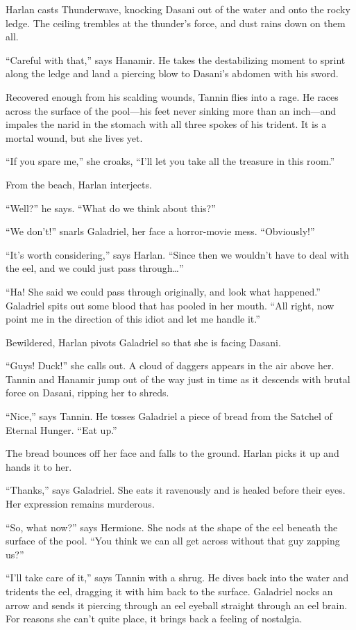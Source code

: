 \documentclass[smalldemyvopaper,11pt,twoside,onecolumn,openright,extrafontsizes]{memoir}
\begin{document}
Harlan casts Thunderwave, knocking Dasani out of the water and onto the
rocky ledge. The ceiling trembles at the thunder's force, and dust rains
down on them all.

``Careful with that,'' says Hanamir. He takes the destabilizing moment
to sprint along the ledge and land a piercing blow to Dasani's abdomen
with his sword.

Recovered enough from his scalding wounds, Tannin flies into a rage. He
races across the surface of the pool---his feet never sinking more than
an inch---and impales the narid in the stomach with all three spokes of
his trident. It is a mortal wound, but she lives yet.

``If you spare me,'' she croaks, ``I'll let you take all the treasure in
this room.''

From the beach, Harlan interjects.

``Well?'' he says. ``What do we think about this?''

``We don't!'' snarls Galadriel, her face a horror-movie mess.
``Obviously!''

``It's worth considering,'' says Harlan. ``Since then we wouldn't have
to deal with the eel, and we could just pass through\ldots{}''

``Ha! She said we could pass through originally, and look what
happened.'' Galadriel spits out some blood that has pooled in her mouth.
``All right, now point me in the direction of this idiot and let me
handle it.''

Bewildered, Harlan pivots Galadriel so that she is facing Dasani.

``Guys! Duck!'' she calls out. A cloud of daggers appears in the air
above her. Tannin and Hanamir jump out of the way just in time as it
descends with brutal force on Dasani, ripping her to shreds.

``Nice,'' says Tannin. He tosses Galadriel a piece of bread from the
Satchel of Eternal Hunger. ``Eat up.''

The bread bounces off her face and falls to the ground. Harlan picks it
up and hands it to her.

``Thanks,'' says Galadriel. She eats it ravenously and is healed before
their eyes. Her expression remains murderous.

``So, what now?'' says Hermione. She nods at the shape of the eel
beneath the surface of the pool. ``You think we can all get across
without that guy zapping us?''

``I'll take care of it,'' says Tannin with a shrug. He dives back into
the water and tridents the eel, dragging it with him back to the
surface. Galadriel nocks an arrow and sends it piercing through an eel
eyeball straight through an eel brain. For reasons she can't quite
place, it brings back a feeling of nostalgia.
\end{document}
